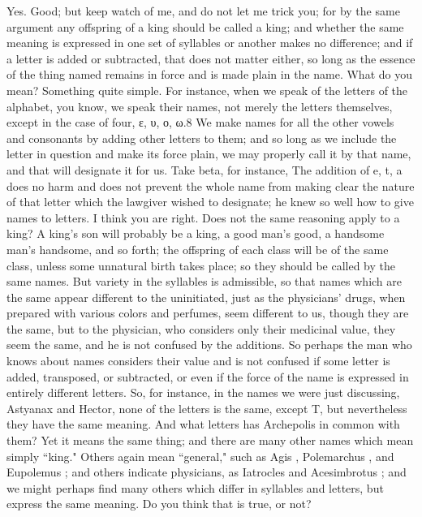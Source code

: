 \hermogenesspeaks
Yes.
\socratesspeaks
Good; but keep watch of me, and do not let me trick you; for by the same argument any offspring of a king should be called a king;  and whether the same meaning is expressed in one set of syllables or another makes no difference; and if a letter is added or subtracted, that does not matter either, so long as the essence of the thing named remains in force and is made plain in the name.
\hermogenesspeaks
What do you mean?
\socratesspeaks
Something quite simple. For instance, when we speak of the letters of the alphabet, you know, we speak their names, not merely the letters themselves, except in the case of four, ε, υ, ο, ω.8  We make names for all the other vowels and consonants by adding other letters to them; and so long as we include the letter in question and make its force plain, we may properly call it by that name, and that will designate it for us. Take beta, for instance, The addition of e, t, a does no harm and does not prevent the whole name from making clear the nature of that letter which the lawgiver wished to designate; he knew so well how to give names to letters.
\hermogenesspeaks
I think you are right.
\socratesspeaks
Does not the same reasoning apply to a king?  A king's son will probably be a king, a good man's good, a handsome man's handsome, and so forth; the offspring of each class will be of the same class, unless some unnatural birth takes place; so they should be called by the same names. But variety in the syllables is admissible, so that names which are the same appear different to the uninitiated, just as the physicians' drugs, when prepared with various colors and perfumes, seem different to us, though they are the same, but to the physician,  who considers only their medicinal value, they seem the same, and he is not confused by the additions. So perhaps the man who knows about names considers their value and is not confused if some letter is added, transposed, or subtracted, or even if the force of the name is expressed in entirely different letters. So, for instance, in the names we were just discussing, Astyanax and Hector, none of the letters is the same, except T,  but nevertheless they have the same meaning. And what letters has Archepolis  in common with them? Yet it means the same thing; and there are many other names which mean simply ``king." Others again mean ``general," such as Agis , Polemarchus , and Eupolemus ; and others indicate physicians, as Iatrocles  and Acesimbrotus ; and we might perhaps find many others which differ in syllables and letters, but express the same meaning. Do you think that is true, or not? 
